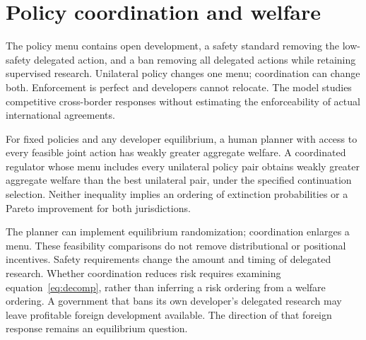 \section{Policy coordination and welfare}\label{sec:policy}
The policy menu contains open development, a safety standard removing the low-safety delegated action, and a ban removing all delegated actions while retaining supervised research. Unilateral policy changes one menu; coordination can change both. Enforcement is perfect and developers cannot relocate. The model studies competitive cross-border responses without estimating the enforceability of actual international agreements.

\begin{proposition}\label{prop:planner}
For fixed policies and any developer equilibrium, a human planner with access to every feasible joint action has weakly greater aggregate welfare. A coordinated regulator whose menu includes every unilateral policy pair obtains weakly greater aggregate welfare than the best unilateral pair, under the specified continuation selection. Neither inequality implies an ordering of extinction probabilities or a Pareto improvement for both jurisdictions.
\end{proposition}
The planner can implement equilibrium randomization; coordination enlarges a menu. These feasibility comparisons do not remove distributional or positional incentives. Safety requirements change the amount and timing of delegated research. Whether coordination reduces risk requires examining equation~\eqref{eq:decomp}, rather than inferring a risk ordering from a welfare ordering. A government that bans its own developer's delegated research may leave profitable foreign development available. The direction of that foreign response remains an equilibrium question.
